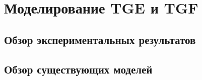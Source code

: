 \chapter{Моделирование TGE и TGF
}\label{ch:thunderstorm}

\section{Обзор экспериментальных результатов
}\label{sec:thunderstorm/review-exp}



\section{Обзор существующих моделей}\label{sec:thunderstorm/review-mod}

